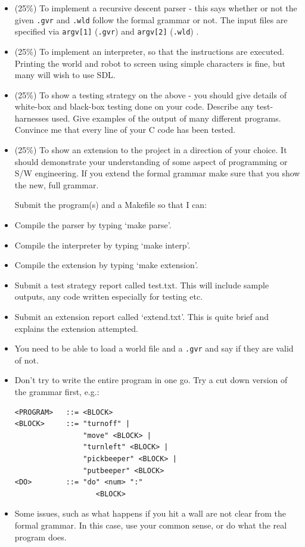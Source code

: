 \begin{exercise}
\begin{itemize}

\item (25\%) To implement a recursive descent parser - this says
whether or not the given \verb^.gvr^ and \verb^.wld^ follow the formal grammar or not.
The input files are specified via \verb^argv[1]^ (\verb^.gvr^) and \verb^argv[2]^ (\verb^.wld^) .

\item (25\%) To implement an interpreter, so that the instructions are
executed. Printing the world and robot to screen
using simple characters is fine, but many will wish to use SDL.

\item (25\%) To show a testing strategy on the above -
you should give details of
white-box and black-box testing done on your code. Describe any
test-harnesses used. Give examples of the output of many different
programs. Convince me that every line of your C code
has been tested.

\item (25\%) To show an extension to the project in a direction of
your choice. It should demonstrate your understanding of some aspect
of programming or S/W engineering. If you extend the formal grammar
make sure that you show the new, full grammar.

Submit the program(s) and a Makefile so that I can:

\item Compile the parser by typing `make parse'.
\item Compile the interpreter by typing `make interp'.
\item Compile the extension by typing `make extension'.
\item Submit a test strategy report called test.txt. This will include
sample outputs, any code written especially for testing etc.
\item Submit an extension report called `extend.txt'. This is quite
brief and explains the extension attempted.

\item You need to be able to load a world file and a \verb^.gvr^
and say if they are valid of not.
\item Don't try to write the entire program in one go. Try a cut
down version of the grammar first, e.g.:
{\small
\begin{verbatim}
<PROGRAM>   ::= <BLOCK>
<BLOCK>     ::= "turnoff" |
                "move" <BLOCK> |
                "turnleft" <BLOCK> |
                "pickbeeper" <BLOCK> |
                "putbeeper" <BLOCK>
<DO>        ::= "do" <num> ":"
                   <BLOCK>
\end{verbatim}
}
\item Some issues, such as what happens if you hit a wall
are not clear from the formal grammar. In this case, use your
common sense, or do what the real program does.
\end{itemize}
\end{exercise}

